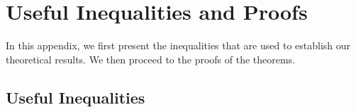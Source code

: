 \documentclass{article}
\theoremstyle{plain}
\begin{document}






\newpage
\appendix
\onecolumn
\allowdisplaybreaks

\section{Useful Inequalities and Proofs}
\label{appendix:theory}

In this appendix, we first present the inequalities that are used to establish our theoretical results. We then proceed to the proofs of the theorems. 

\subsection{Useful Inequalities}
\end{document}
